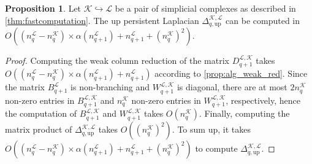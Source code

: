 \documentclass{article}
\theoremstyle{definition}
\newtheorem{proposition}[theorem]{Proposition}
\newcommand{\KK}{\mathcal{K}}
\newcommand{\LL}{\mathcal{L}}
\begin{document}
\begin{proposition}
\label{prop:alg_lap}
Let $\KK\hookrightarrow \LL$ be a pair of simplicial complexes as described in \cref{thm:fastcomputation}.
The up persistent Laplacian $\Delta_{q, \text{up}}^{\KK, \LL}$ can be computed in $O\left((n_q^\LL-n_q^\KK)\times \alpha(n_{q+1}^\LL) + n_{q+1}^\LL+(n_q^\KK)^2\right)$.
\end{proposition}

\begin{proof}
Computing the weak column reduction of the matrix $D_{q+1}^{\LL, \KK}$ takes $O\left((n_q^\LL-n_q^\KK)\times \alpha(n_{q+1}^\LL) + n_{q+1}^\LL\right)$ according to \cref{prop:alg_weak_red}.
Since the matrix $B_{q+1}^\LL$ is non-branching and $W_{q+1}^{\LL, \KK}$ is diagonal,
there are at most $2n_{q}^\KK$ non-zero entries in $B_{q+1}^{\LL,\KK}$ and $n_{q}^\KK$ non-zero entries in $W_{q+1}^{\LL, \KK}$, respectively,
hence the computation of $B_{q+1}^{\LL, \KK}$ and $W_{q+1}^{\LL, \KK}$ takes $O(n_q^\KK)$.
Finally,
computing the matrix product of $\Delta_{q, \text{up}}^{\KK, \LL}$ takes $O((n_q^\KK)^2)$.
To sum up,
it takes $O\left((n_q^\LL-n_q^\KK)\times \alpha(n_{q+1}^\LL) + n_{q+1}^\LL+(n_q^\KK)^2\right)$ to compute $\Delta_{q, \text{up}}^{\KK, \LL}$.
\end{proof}


\end{document}
